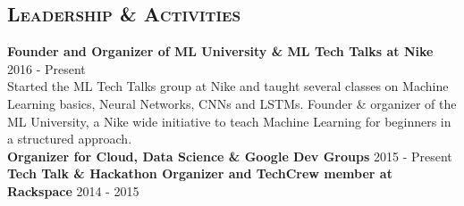 \begin{resume}






\section{\textsc{Leadership \& Activities}}
\textbf{Founder and Organizer of ML University \& ML Tech Talks at Nike} \hfill 2016 - Present\\
Started the ML Tech Talks group at Nike and taught several classes on Machine Learning basics, Neural Networks, CNNs and LSTMs. Founder \& organizer of the ML University, a Nike wide initiative to teach Machine Learning for beginners in a structured approach.\\
\textbf{Organizer for Cloud, Data Science \& Google Dev Groups} \hfill 2015 - Present\\
\textbf{Tech Talk \& Hackathon Organizer and TechCrew member at Rackspace} \hfill 2014 - 2015\\



\end{resume}
